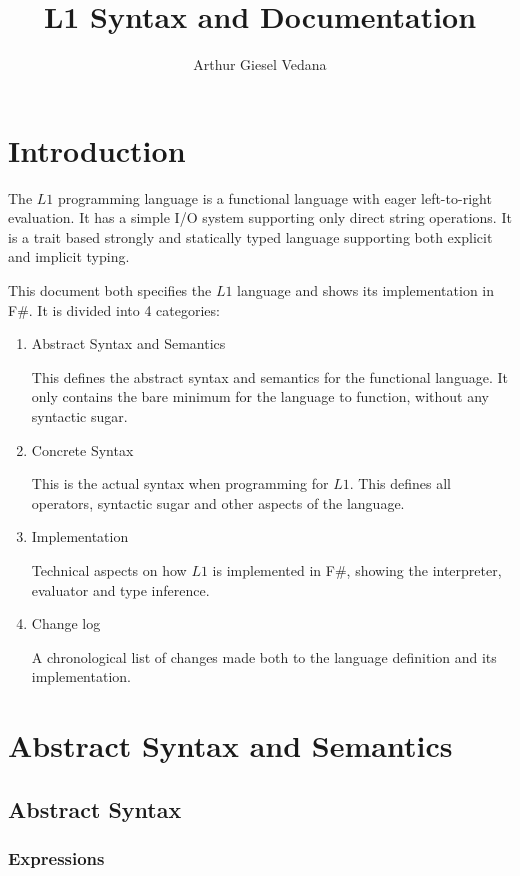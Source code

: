 \documentclass{article}
\author{Arthur Giesel Vedana}
\title{L1 Syntax and Documentation}
\begin{document}
\maketitle
{}
\newpage

\tableofcontents
\newpage

\section*{Introduction}
The $L1$ programming language is a functional language with eager left-to-right evaluation.
It has a simple I/O system supporting only direct string operations. 
It is a trait based strongly and statically typed language supporting both explicit and implicit typing.


This document both specifies the $L1$ language and shows its implementation in F\#.
It is divided into 4 categories:
\begin{enumerate}
	\item Abstract Syntax and Semantics
	
		This defines the abstract syntax and semantics for the functional language.
		It only contains the bare minimum for the language to function, without any syntactic sugar. 
	\item Concrete Syntax
	
		This is the actual syntax when programming for $L1$.
		This defines all operators, syntactic sugar and other aspects of the language.
	\item Implementation
	
		Technical aspects on how $L1$ is implemented in F\#, showing the interpreter, evaluator and type inference.
	\item Change log
	
		A chronological list of changes made both to the language definition and its implementation.
\end{enumerate}

\newpage
{}
\section{Abstract Syntax and Semantics}

\subsection{Abstract Syntax}

\subsubsection{Expressions}
\end{document}
